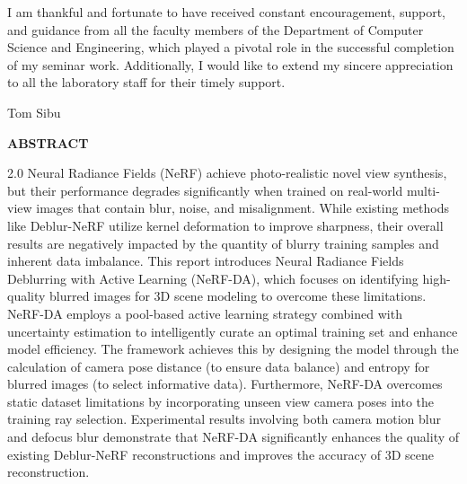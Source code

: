 \vspace{-0.3cm}

I am thankful and fortunate to have received constant encouragement, support, and guidance
from all the faculty members of the Department of Computer Science and Engineering, which
played a pivotal role in the successful completion of my seminar work. Additionally, I would
like to extend my sincere appreciation to all the laboratory staff for their timely support.

\begin{flushright}
    Tom Sibu
\end{flushright}

\newpage
\renewcommand\contentsname{\MakeUppercase{\large contents}\bf\hspace{11cm}\large PAGE NO}
\thispagestyle{empty}
\tableofcontents
\thispagestyle{empty}
\newpage
{}
\fancyhf{}
\fancyfoot[R]{\hfill\thepage}
\renewcommand{\footrulewidth}{0pt}
\begin{center}
  \vspace*{1cm}
  \textbf{\large ABSTRACT}
\end{center}
\begin{spacing}{2.0}
Neural Radiance Fields (NeRF) achieve photo-realistic novel view synthesis, but their performance degrades significantly when trained on real-world multi-view images that contain blur, noise, and misalignment. While existing methods like Deblur-NeRF utilize kernel deformation to improve sharpness, their overall results are negatively impacted by the quantity of blurry training samples and inherent data imbalance. This report introduces Neural Radiance Fields Deblurring with Active Learning (NeRF-DA), which focuses on identifying high-quality blurred images for 3D scene modeling to overcome these limitations. NeRF-DA employs a pool-based active learning strategy combined with uncertainty estimation to intelligently curate an optimal training set and enhance model efficiency. The framework achieves this by designing the model through the calculation of camera pose distance (to ensure data balance) and entropy for blurred images (to select informative data). Furthermore, NeRF-DA overcomes static dataset limitations by incorporating unseen view camera poses into the training ray selection. Experimental results involving both camera motion blur and defocus blur demonstrate that NeRF-DA significantly enhances the quality of existing Deblur-NeRF reconstructions and improves the accuracy of 3D scene reconstruction.
\end{spacing}

